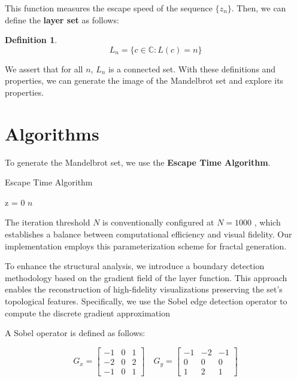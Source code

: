 \documentclass[11pt]{article}
\newtheorem{definition}{Definition}
\begin{document}
    This function measures the escape speed of the sequence $\{z_n\}$.
    Then, we can define the \textbf{layer set} as follows:

    \begin{definition}
        \begin{equation}
            L_n = \{c \in \mathbb{C} : L(c) = n \} \label{eq:layer_set}
        \end{equation}
    \end{definition}

    We assert that for all $n$, $L_n$ is a connected set.
    With these definitions and properties, we can generate the image of the Mandelbrot set and explore its properties.


    \section{Algorithms}\label{sec:algorithms}

    To generate the Mandelbrot set, we use the \textbf{Escape Time Algorithm}.

    \begin{algorithm}[H]
        \SetAlgoLined
        \caption{Escape Time Algorithm}
        \label{alg:escape_time_algorithm}
        z = 0\;
        \Return $n$\;
    \end{algorithm}

    The iteration threshold $N$ is conventionally configured at $N = 1000$
    , which establishes a balance between computational efficiency and visual fidelity.
    Our implementation employs this parameterization scheme for fractal generation.

    To enhance the structural analysis, we introduce a boundary detection methodology based on the gradient field of the
    layer function.
    This approach enables the reconstruction of high-fidelity visualizations preserving the set's topological features.
    Specifically, we use the Sobel edge detection operator to compute the discrete gradient approximation

    A Sobel operator is defined as follows:

    \begin{equation}
        \label{eq:sobel_operator}
        G_x = \begin{bmatrix}
                  -1 & 0 & 1 \\
                  -2 & 0 & 2 \\
                  -1 & 0 & 1
        \end{bmatrix}
        \quad
        G_y = \begin{bmatrix}
                  -1 & -2 & -1 \\
                  0  & 0  & 0  \\
                  1  & 2  & 1
        \end{bmatrix}
    \end{equation}
\end{document}
